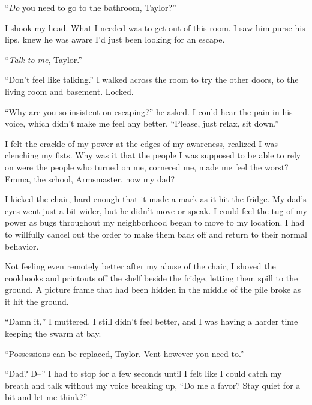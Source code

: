 ``\emph{Do} you need to go to the bathroom, Taylor?''



I shook my head.  What I needed was to get out of this room.  I saw him purse his lips, knew he was aware I'd just been looking for an escape.



``\emph{Talk to me}, Taylor.''



``Don't feel like talking.''  I walked across the room to try the other doors, to the living room and basement.  Locked.



``Why are you so insistent on escaping?'' he asked.  I could hear the pain in his voice, which didn't make me feel any better.  ``Please, just relax, sit down.''



I felt the crackle of my power at the edges of my awareness, realized I was clenching my fists.  Why was it that the people I was supposed to be able to rely on were the people who turned on me, cornered me, made me feel the worst?  Emma, the school, Armsmaster, now my dad?



I kicked the chair, hard enough that it made a mark as it hit the fridge.  My dad's eyes went just a bit wider, but he didn't move or speak.  I could feel the tug of my power as bugs throughout my neighborhood began to move to my location.  I had to willfully cancel out the order to make them back off and return to their normal behavior.



Not feeling even remotely better after my abuse of the chair, I shoved the cookbooks and printouts off the shelf beside the fridge, letting them spill to the ground.  A picture frame that had been hidden in the middle of the pile broke as it hit the ground.



``Damn it,'' I muttered.  I still didn't feel better, and I was having a harder time keeping the swarm at bay.



``Possessions can be replaced, Taylor.  Vent however you need to.''



``Dad?  D--'' I had to stop for a few seconds until I felt like I could catch my breath and talk without my voice breaking up, ``Do me a favor?  Stay quiet for a bit and let me think?''



